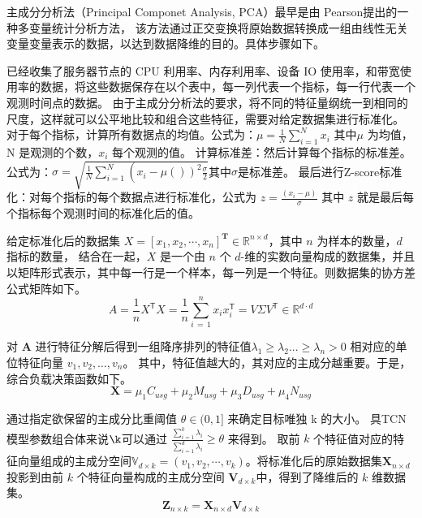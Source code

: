 主成分分析法（Principal Componet Analysis, PCA）最早是由 Pearson\cite{kpfrs1901lines}提出的一种多变量统计分析方法，
该方法通过正交变换将原始数据转换成一组由线性无关变量变量表示的数据，以达到数据降维的目的\cite{李可佳2023基于主成分分析和函数机制的差分隐私线性回归算法}。具体步骤如下。

已经收集了服务器节点的 CPU 利用率、内存利用率、设备 IO 使用率，和带宽使用率的数据，将这些数据保存在以个表中，每一列代表一个指标，每一行代表一个观测时间点的数据。
由于主成分分析法的要求，将不同的特征量纲统一到相同的尺度，这样就可以公平地比较和组合这些特征，需要对给定数据集进行标准化。
对于每个指标，计算所有数据点的均值。公式为：$\mu=\frac{1}{N}\sum_{i=1}^{N}x_{i}$ 其中$\mu$ 为均值，N 是观测的个数，$x_{i}$ 每个观测的值。
计算标准差：然后计算每个指标的标准差。公式为：$\sigma = \sqrt{\frac{1}{N} \sum_{i = 1}^{N} \left(\right. x_{i} - \mu \left(\left.\right)\right)^{2}\frac{\sigma}{2}}$其中$\sigma$是标准差。
最后进行Z-score标准化：对每个指标的每个数据点进行标准化，公式为 $z = \frac{(x_{i} - \mu)}{\sigma}$ 其中 $z$ 就是最后每个指标每个观测时间的标准化后的值。

给定标准化后的数据集 $X = [x_1, x_2, \cdots, x_n]^{\mathbf{T}} \in \mathbb{R}^{n \times d}$，其中 $n$ 为样本的数量，$d$ 指标的数量，
结合在一起，\( X \) 是一个由 \( n \) 个 \( d \)-维的实数向量构成的数据集，并且以矩阵形式表示，其中每一行是一个样本，每一列是一个特征。则数据集的协方差公式矩阵如下。
\begin{equation}
  A={\frac{1}{n}}X^{\mathsf{T}}X={\frac{1}{n}}\sum_{i\,=\,1}^{n}x_{i}x_{i}^{\mathsf{T}}=V\Sigma V^{\mathsf{T}}\in\mathbb{R}^{d\cdot d}
\end{equation}

对 $\mathbf{A}$ 进行特征分解后得到一组降序排列的特征值$\lambda_1 \ge \lambda_2 ... \ge \lambda_n > 0$ 相对应的单位特征向量 $v_1, v_2, \dots, v_n$。
其中，特征值越大的，其对应的主成分越重要。于是，综合负载决策函数如下。
\begin{equation}
  \mathbf{X} = \mu_1C_{usg} + \mu_2M_{usg} + \mu_3D_{usg} + \mu_4N_{usg}
\end{equation}

通过指定欲保留的主成分比重阈值 $\theta \in (0, 1]$ 来确定目标唯独 k 的大小。
具TCN 模型参数组合体来说$\k$可以通过 $\frac{\sum^{k}_{i = 1}\lambda_i}{\sum^{d}_{i = 1}\lambda_i} \ge \theta$ 来得到。
取前 $k$ 个特征值对应的特征向量组成的主成分空间$\mathbb{V}_{d \times k} = (v_1, v_2, \cdots, v_k)$。将标准化后的原始数据集$\mathbf{X}_{n \times d}$ 投影到由前 $k$ 个特征向量构成的主成分空间 $\mathbf{V}_{d \times k}$中，得到了降维后的 $k$ 维数据集。
\begin{equation}
  \mathbf{Z}_{n \times k} = \mathbf{X}_{n \times d}\mathbf{V}_{d \times k}
\end{equation}

